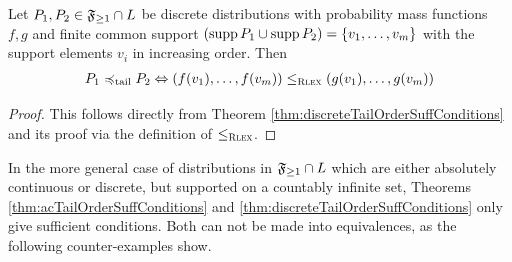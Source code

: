 \documentclass[a4paper]{scrreprt}
\begin{document}
    \begin{cor}
        Let $P_1, P_2 \in \mathfrak{F}_{\geq 1} \cap L$ be discrete distributions with probability mass functions $f, g$ and finite common support $(\operatorname{supp} P_1 \cup \operatorname{supp} P_2) = \{v_1, \dots, v_m\}$ with the support elements $v_i$ in increasing order. Then
        \begin{gather}            
            P_1 \preccurlyeq_{\text{tail}} P_2 \Leftrightarrow (f(v_1), \dots, f(v_m)) \leq_{\textsc{Rlex}} (g(v_1), \dots, g(v_m))
            \label{eq:discreteFiniteTailOrder-RLexEquivalence}
        \end{gather}
        \label{cor:discreteFiniteTailOrder-RLexEquivalence}
    \end{cor}
    \begin{proof}
        This follows directly from Theorem \ref{thm:discreteTailOrderSuffConditions} and its proof via the definition of $\leq_{\textsc{Rlex}}$.
    \end{proof}    
    In the more general case of distributions in $\mathfrak{F}_{\geq 1} \cap L$ which are either absolutely continuous or discrete, but supported on a countably infinite set, Theorems \ref{thm:acTailOrderSuffConditions} and \ref{thm:discreteTailOrderSuffConditions} only give sufficient conditions. Both can not be made into equivalences, as the following counter-examples show.
\end{document}
